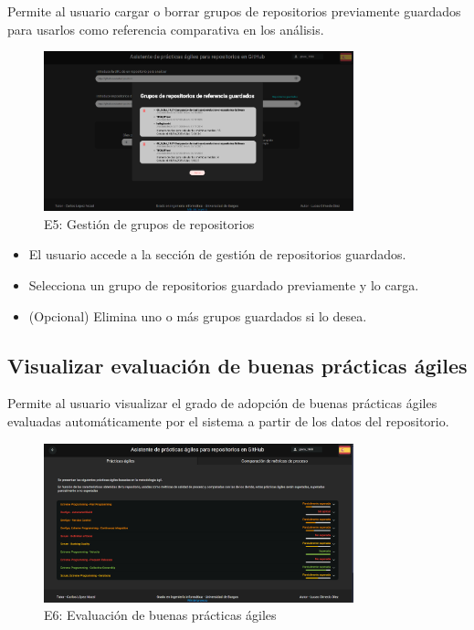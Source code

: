 Permite al usuario cargar o borrar grupos de repositorios previamente guardados para usarlos como referencia comparativa en los análisis.

\begin{figure}[H]
\centering
\includegraphics[width=0.8\textwidth]{img/E5-grupos.png}
\caption{E5: Gestión de grupos de repositorios}
\label{fig:E5-grupos}
\end{figure}

\begin{itemize}
    \item El usuario accede a la sección de gestión de repositorios guardados.
    \item Selecciona un grupo de repositorios guardado previamente y lo carga.
    \item (Opcional) Elimina uno o más grupos guardados si lo desea.
\end{itemize}

\newpage
\subsection{Visualizar evaluación de buenas prácticas ágiles}

Permite al usuario visualizar el grado de adopción de buenas prácticas ágiles evaluadas automáticamente por el sistema a partir de los datos del repositorio.

\begin{figure}[H]
\centering
\includegraphics[width=0.8\textwidth]{img/E6-practicas-agiles.png}
\caption{E6: Evaluación de buenas prácticas ágiles}
\label{fig:E6-practicas-agiles}
\end{figure}

